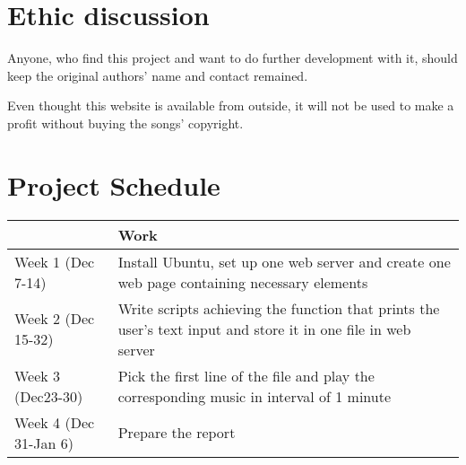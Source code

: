 \chapter{Ethic discussion}
Anyone, who find this project and want to do further development with it, should keep the original authors' name and contact remained. 

Even thought this website is available from outside, it will not be used to make a profit without buying the songs' copyright.

\chapter{Project Schedule}
\begin{center}
	\begin{tabular}{| l | p{10cm} | }
		\hline
		 & Work \\
		\hline
		Week 1 (Dec 7-14) & Install Ubuntu, set up one web server and create one web page containing necessary elements \\
		\hline
		Week 2 (Dec 15-32) & Write scripts achieving the function that prints the user's text input and store it in one file in web server \\
		\hline
		Week 3 (Dec23-30) & Pick the first line of the file and play the corresponding music in interval of 1 minute  \\
		\hline
		Week 4 (Dec 31-Jan 6) & Prepare the report \\ 
		\hline
	\end{tabular}
\end{center}
